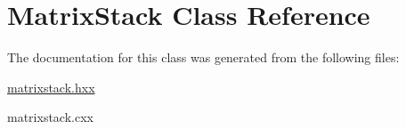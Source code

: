 \hypertarget{classMatrixStack}{\section{Matrix\-Stack Class Reference}
\label{classMatrixStack}
}


The documentation for this class was generated from the following files\-:\begin{DoxyCompactItemize}
\item 
\hyperlink{matrixstack_8hxx}{matrixstack.\-hxx}\item 
matrixstack.\-cxx\end{DoxyCompactItemize}
